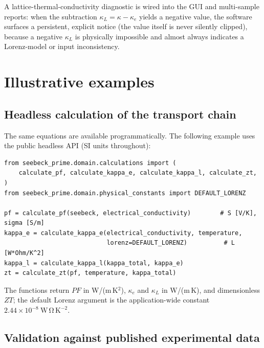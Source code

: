 \documentclass[preprint,12pt, a4paper]{elsarticle}
\begin{document}
A lattice-thermal-conductivity diagnostic is wired into the GUI and
multi-sample reports: when the subtraction $\kappa_{L} = \kappa - \kappa_{e}$
yields a negative value, the software surfaces a persistent, explicit notice
(the value itself is never silently clipped), because a negative $\kappa_{L}$
is physically impossible and almost always indicates a Lorenz-model or input
inconsistency.


\section{Illustrative examples}
\label{sec:examples}

\subsection{Headless calculation of the transport chain}
\label{sec:example-headless}

The same equations are available programmatically. The following example uses
the public headless API (SI units throughout):

\begin{verbatim}
from seebeck_prime.domain.calculations import (
    calculate_pf, calculate_kappa_e, calculate_kappa_l, calculate_zt,
)
from seebeck_prime.domain.physical_constants import DEFAULT_LORENZ

pf = calculate_pf(seebeck, electrical_conductivity)        # S [V/K], sigma [S/m]
kappa_e = calculate_kappa_e(electrical_conductivity, temperature,
                            lorenz=DEFAULT_LORENZ)          # L [W*Ohm/K^2]
kappa_l = calculate_kappa_l(kappa_total, kappa_e)
zt = calculate_zt(pf, temperature, kappa_total)
\end{verbatim}

\noindent
The functions return $PF$ in W/(m\,K$^{2}$), $\kappa_{e}$ and $\kappa_{L}$ in
W/(m\,K), and dimensionless $ZT$; the default Lorenz argument is the
application-wide constant $2.44\times10^{-8}\ \mathrm{W\,\Omega\,K^{-2}}$.

\subsection{Validation against published experimental data}
\label{sec:example-benchmarks}
\end{document}
